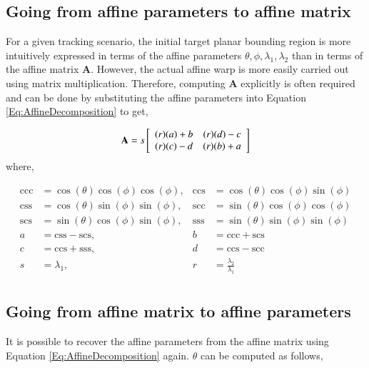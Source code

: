 \documentclass[12pt,letterpaper,doublespaced,ETD]{gt-ece-thesis} %
\begin{document}
\begin{Body}
\subsection{Going from affine parameters to affine matrix}
For a given tracking scenario, the initial target planar bounding region is more intuitively expressed in terms of the affine parameters $\theta, \phi, \lambda_1, \lambda_2$ than in terms of the affine matrix $\mathbf{A}$.  However, the actual affine warp is more easily carried out using matrix multiplication.  Therefore, computing $\mathbf{A}$ explicitly is often required and can be done by substituting the affine parameters into Equation \ref{Eq:AffineDecomposition} to get,

\begin{equation}
\mathbf{A} = s \left[ \begin{array}{cc} (r)(a) + b & (r)(d) - c \\ (r)(c) - d & (r)(b) + a \end{array} \right]
\end{equation}
where,

\begin{equation*}
\begin{array}{llll}
\mathrm{ccc} &= \cos(\theta) \cos(\phi) \cos(\phi), & \mathrm{ccs} &= \cos(\theta) \cos(\phi) \sin(\phi)\\
\mathrm{css} &= \cos(\theta) \sin(\phi) \sin(\phi), & \mathrm{scc} &= \sin(\theta) \cos(\phi) \cos(\phi)\\
\mathrm{scs} &= \sin(\theta) \cos(\phi) \sin(\phi), & \mathrm{sss} &= \sin(\theta) \sin(\phi) \sin(\phi)\\
a   &=  \mathrm{css} - \mathrm{scs}, & b   &=  \mathrm{ccc} + \mathrm{scs}\\
c   &= \mathrm{ccs} + \mathrm{sss}, & d   &=  \mathrm{ccs} - \mathrm{scc}\\
s 			    &= \lambda_1, & r 			    &= \frac{\lambda_2}{\lambda_1}\\
\end{array}
\end{equation*}

\subsection{Going from affine matrix to affine parameters}
It is possible to recover the affine parameters from the affine matrix using Equation \ref{Eq:AffineDecomposition} again.  $\theta$  can be computed as follows,  


\end{Body}
\end{document}
